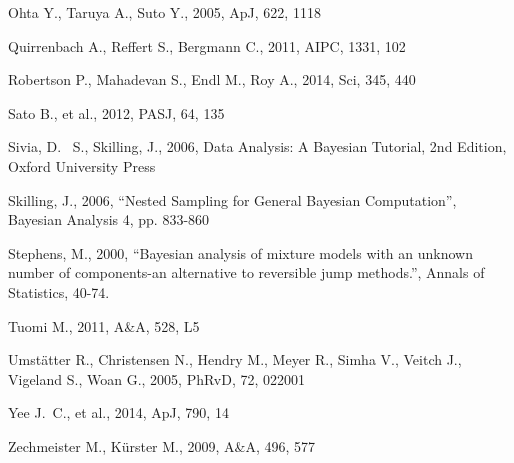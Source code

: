 \documentclass[useAMS,usenatbib]{mn2e}
\begin{document}
\begin{thebibliography}{99}
 Ohta Y., Taruya A., Suto Y., 2005, ApJ, 622, 1118

 Quirrenbach A., Reffert S., Bergmann C., 2011, AIPC, 1331, 102 

 Robertson P., Mahadevan S., Endl M., Roy 
A., 2014, Sci, 345, 440 

Sato B., et al., 2012, PASJ, 64, 135 

 Sivia, 
D.~ S., Skilling, J., 2006, Data Analysis: A Bayesian Tutorial, 2nd 
Edition, Oxford University Press

 Skilling, 
J., 2006, ``Nested Sampling for General Bayesian Computation'', Bayesian 
Analysis 4, pp. 833-860

 Stephens, M., 2000, ``Bayesian analysis of mixture models with an unknown number of components-an alternative to reversible jump methods.'', Annals of Statistics, 40-74.

 Tuomi M., 2011, A\&A, 528, L5 

 Umst{\"a}tter R., Christensen N., Hendry 
M., Meyer R., Simha V., Veitch J., Vigeland S., Woan G., 2005, PhRvD, 72, 
022001 

Yee J.~C., et al., 2014, ApJ, 790, 14 

 Zechmeister M., K{\"u}rster M., 2009, A\&A, 496, 577  

\end{thebibliography}
\end{document}
